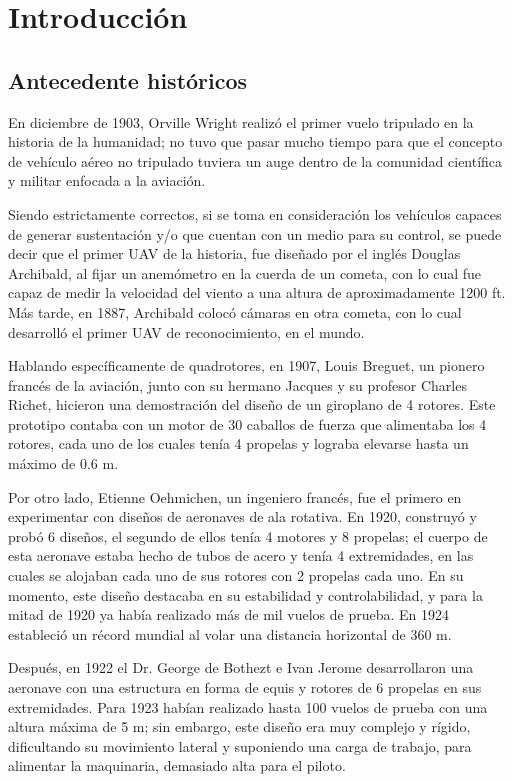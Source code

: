 \chapter{Introducción}

\section{Antecedente históricos}
En diciembre de 1903, Orville Wright realizó el primer vuelo tripulado en la historia de la humanidad; no tuvo que pasar mucho tiempo para que el concepto de vehículo aéreo no tripulado tuviera un auge dentro de la comunidad científica y militar enfocada a la aviación.

Siendo estrictamente correctos, si se toma en consideración los vehículos capaces de generar sustentación y/o que cuentan con un medio para su control, se puede decir que el primer UAV de la historia, fue diseñado por el inglés Douglas Archibald, al fijar un anemómetro en la cuerda de un cometa, con lo cual fue capaz de medir  la velocidad del viento a una altura de aproximadamente 1200 ft. Más tarde, en 1887, Archibald colocó cámaras en otra cometa, con lo cual desarrolló el primer UAV de reconocimiento, en el mundo.

Hablando específicamente de quadrotores, en 1907, Louis Breguet, un pionero francés de la aviación, junto con su hermano Jacques y su profesor Charles Richet, hicieron una demostración del diseño de un giroplano de 4 rotores. Este prototipo contaba con un motor de 30 caballos de fuerza que alimentaba los 4 rotores, cada uno de los cuales tenía 4 propelas y lograba elevarse hasta un máximo de 0.6 m.

Por otro lado, Etienne Oehmichen, un ingeniero francés, fue el primero en experimentar con diseños de aeronaves de ala rotativa. En 1920, construyó y probó 6 diseños, el segundo de ellos tenía 4 motores y 8 propelas; el cuerpo de esta aeronave estaba hecho de tubos de acero y tenía 4 extremidades, en las cuales se alojaban cada uno de sus rotores con 2 propelas cada uno. En su momento, este diseño destacaba en su estabilidad y controlabilidad, y para la mitad de 1920 ya había realizado más de mil vuelos de prueba. En 1924 estableció un récord mundial al volar una distancia horizontal de 360 m.

Después, en 1922 el Dr. George de Bothezt e Ivan Jerome desarrollaron una aeronave con una estructura en forma de equis y rotores de 6 propelas en sus extremidades. Para 1923 habían realizado hasta 100 vuelos de prueba con una altura máxima de 5 m; sin embargo, este diseño era muy complejo y rígido, dificultando su movimiento lateral y suponiendo una  carga de trabajo, para alimentar la maquinaria, demasiado alta para el piloto.

